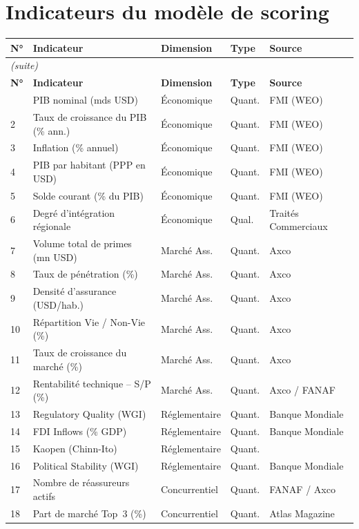 \documentclass[../main.tex]{subfiles}
\begin{document}
\chapter{Indicateurs du modèle de scoring}
\label{ann:indicateurs}

\begin{longtable}{@{}p{0.5cm}p{4.5cm}p{3cm}p{1.6cm}p{2.8cm}@{}}
\toprule
\textbf{N°} & \textbf{Indicateur} & \textbf{Dimension} & \textbf{Type} & \textbf{Source} \\
\midrule
\endfirsthead
\multicolumn{5}{l}{\small\itshape (suite)}\\\toprule
\textbf{N°} & \textbf{Indicateur} & \textbf{Dimension} & \textbf{Type} & \textbf{Source}\\\midrule
\endhead
\bottomrule\endfoot
1  & PIB nominal (mds USD)               & Économique      & Quant. & FMI (WEO) \\
2  & Taux de croissance du PIB (\% ann.) & Économique      & Quant. & FMI (WEO) \\
3  & Inflation (\% annuel)               & Économique      & Quant. & FMI (WEO) \\
4  & PIB par habitant (PPP en USD)       & Économique      & Quant. & FMI (WEO) \\
5  & Solde courant (\% du PIB)           & Économique      & Quant. & FMI (WEO) \\
6  & Degré d'intégration régionale       & Économique      & Qual.  & Traités Commerciaux \\
\midrule
7  & Volume total de primes (mn USD)     & Marché Ass.     & Quant. & Axco \\
8  & Taux de pénétration (\%)            & Marché Ass.     & Quant. & Axco \\
9  & Densité d'assurance (USD/hab.)      & Marché Ass.     & Quant. & Axco \\
10 & Répartition Vie / Non-Vie (\%)      & Marché Ass.     & Quant. & Axco \\
11 & Taux de croissance du marché (\%)   & Marché Ass.     & Quant. & Axco \\
12 & Rentabilité technique -- S/P (\%)   & Marché Ass.     & Quant. & Axco / FANAF \\
\midrule
13 & Regulatory Quality (WGI)            & Réglementaire   & Quant. & Banque Mondiale \\
14 & FDI Inflows (\% GDP)                & Réglementaire   & Quant. & Banque Mondiale \\
15 & Kaopen (Chinn-Ito)                  & Réglementaire   & Quant. & \citet{ChinnIto2006} \\
16 & Political Stability (WGI)           & Réglementaire   & Quant. & Banque Mondiale \\
\midrule
17 & Nombre de réassureurs actifs        & Concurrentiel   & Quant. & FANAF / Axco \\
18 & Part de marché Top~3 (\%)           & Concurrentiel   & Quant. & Atlas Magazine \\
\end{longtable}
\end{document}
